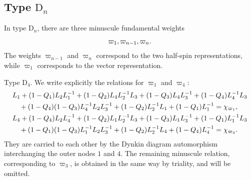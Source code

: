 \documentclass{amsart}
\numberwithin{equation}{section}
\begin{document}
\subsection{Type $\mathrm{D}_n$}

In type $\mathrm{D}_n$, there are three
minuscule fundamental weights
$${\varpi_{1}},{\varpi_{n-1}},{\varpi_{n}}.$$ The weights \(\varpi_{n-1}\) and
\(\varpi_n\) correspond to the two half-spin representations, while
\(\varpi_1\) corresponds to the vector representation.
\begin{example}
Type $\mathrm{D}_4$.
We write explicitly the relations
for \(\varpi_1\) and \(\varpi_4\): 
\begin{equation}
\label{eq:D4-varpi1-minuscule-relation}
\begin{aligned}
&
L_1
+
(1-Q_1)L_2L_1^{-1}
+
(1-Q_2)L_4L_2^{-1}L_3
+
(1-Q_3)L_4L_3^{-1}
+
(1-Q_4)L_4^{-1}L_3
\\
&\quad
+
(1-Q_4)(1-Q_3)L_4^{-1}L_2L_3^{-1}
+
(1-Q_2)L_2^{-1}L_1
+
(1-Q_1)L_1^{-1}
=
\chi_{{\varpi_{1}}},\\
 &
 L_4
 +
 (1-Q_4)L_2L_4^{-1}
 +
 (1-Q_2)L_1L_2^{-1}L_3
 +
 (1-Q_3)L_1L_3^{-1}
 +
 (1-Q_1)L_1^{-1}L_3
 \\
 &\quad
 +
 (1-Q_1)(1-Q_3)L_1^{-1}L_2L_3^{-1}
 +
 (1-Q_2)L_2^{-1}L_4
 +
 (1-Q_4)L_4^{-1}
 =
 \chi_{{\varpi_{4}}}.
\end{aligned}
\end{equation}
They are carried to each other by
the Dynkin diagram automorphism interchanging the outer nodes \(1\)
and \(4\).  The remaining minuscule relation, corresponding to
\(\varpi_3\), is obtained in the same way by triality, and will be
omitted.
\end{example}
\end{document}
